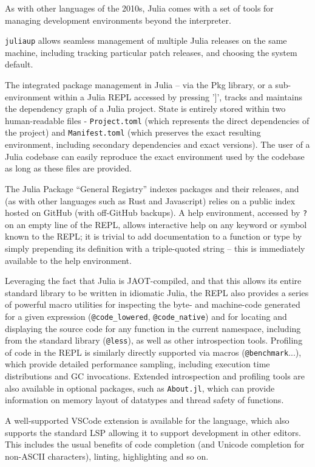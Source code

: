 \documentclass{webofc}
\begin{document}
As with other languages of the 2010s, Julia comes with a set of tools for
managing development environments beyond the interpreter.

\texttt{juliaup} allows seamless management of multiple Julia releases on the same
machine, including tracking particular patch releases, and choosing the system
default.

The integrated package management in Julia -- via the Pkg library, or a
sub-environment within a Julia REPL accessed by pressing '$]$', tracks and
maintains the dependency graph of a Julia project. State is entirely stored
within two human-readable files - \texttt{Project.toml} (which represents the direct
dependencies of the project) and \texttt{Manifest.toml} (which preserves the exact
resulting environment, including secondary dependencies and exact versions).
The user of a Julia codebase can easily reproduce the exact environment used by
the codebase as long as these files are provided.

The Julia Package ``General Registry'' indexes packages and their releases, and
(as with other languages such as Rust and Javascript) relies on a public index
hosted on GitHub (with off-GitHub backups). A help environment, accessed by
\texttt{?} on an empty line of the REPL, allows interactive help on any keyword
or symbol known to the REPL; it is trivial to add documentation to a function or
type by simply prepending its definition with a triple-quoted string -- this is
immediately available to the help environment.

Leveraging the fact that Julia is JAOT-compiled, and that this allows its entire
standard library to be written in idiomatic Julia, the REPL also provides a
series of powerful macro utilities for inspecting the byte- and machine-code
generated for a given expression (\verb$@code_lowered$, \verb$@code_native$) and
for locating and displaying the source code for any function in the current
namespace, including from the standard library (\verb$@less$), as well as other
introspection tools. Profiling of code in the REPL is similarly directly
supported via macros (\verb$@benchmark$...), which provide detailed performance
sampling, including execution time distributions and GC invocations. Extended
introspection and profiling tools are also available in optional packages, such
as \texttt{About.jl}, which can provide information on memory layout of
datatypes and thread safety of functions.

A well-supported VSCode extension is available for the language, which also
supports the standard LSP allowing it to support development in other editors.
This includes the usual benefits of code completion (and Unicode completion for
non-ASCII characters), linting, highlighting and so on.
\end{document}
